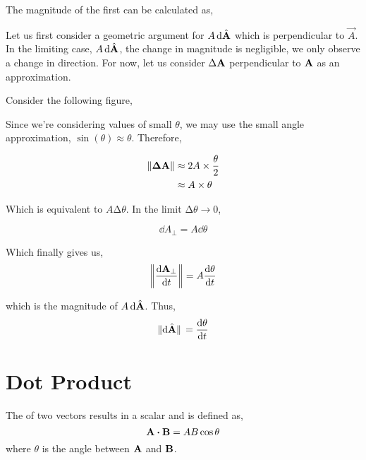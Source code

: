 The magnitude of the first can be calculated as,

Let us first consider a geometric argument for \(A\dd{{\hat{\boldsymbol{\mathbf{A}}}}}\)
which is perpendicular to \(\vec{A}\). In the limiting case, \(A\dd{{\hat{\boldsymbol{\mathbf{A}}}}}\),
the change in magnitude is negligible, we only observe a change in direction. For now,
let us consider \(\Delta \boldsymbol{\mathbf{A}}\) perpendicular to \(\boldsymbol{\mathbf{A}}\) as an approximation.

Consider the following figure,

\begin{figure}
    [H]
    \centering
\end{figure}


Since we're considering values of small \(\theta\), we may use the small angle approximation,
\(\sin(\theta) \approx \theta\). Therefore,

\begin{align}
    \norm{\boldsymbol{\mathbf{\Delta A}}} &\approx 2A \times \frac{\theta}{2}\\ 
    &\approx A \times \theta
\end{align}

Which is equivalent to \(A \increment \theta\). In the limit \(\increment \theta \to 0\),

\begin{equation}
    \dd{A_{\perp}} = A \dd{\theta}
\end{equation}

Which finally gives us,
\begin{equation}
    \norm{\dv{\boldsymbol{\mathbf{A}}_{\perp}}{t}} = A\dv{\theta}{t}
\end{equation}

which is the magnitude of \(A\dd{{\hat{\boldsymbol{\mathbf{A}}}}}\). Thus,
\begin{equation}
    \norm*{\dd{{\hat{\boldsymbol{\mathbf{A}}}}}} = \dv{\theta}{t}
\end{equation}

\section{Dot Product}

The  of two vectors results in a scalar and is defined as,
\[\Aa \dtp \BB = AB \cos\theta\]
where \(\theta\) is the angle between \(\boldsymbol{\mathbf{A}}\) and \(\boldsymbol{\mathbf{B}}\). 

